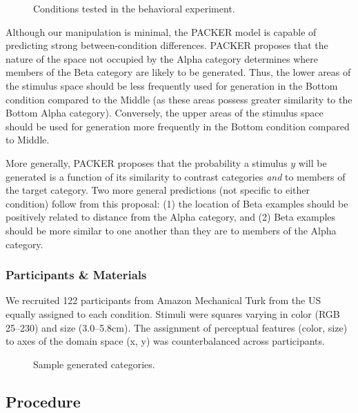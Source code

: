 \documentclass[10pt,letterpaper]{article}
\newcommand\inputpgf[2]{{
\let\pgfimageWithoutPath\pgfimage
\renewcommand{\pgfimage}[2][]{\pgfimageWithoutPath[##1]{#1/##2}}

}}
\begin{document}
\begin{figure}
    \begin{center}
    
    \caption{Conditions tested in the behavioral experiment.}
    \label{fig:middle-bottom-conditions}
    \end{center}
\end{figure}

Although our manipulation is minimal, the PACKER model is capable of predicting strong between-condition differences. PACKER proposes that the nature of the space not occupied by the Alpha category determines where members of the Beta category are likely to be generated. Thus, the lower areas of the stimulus space should be less frequently used for generation in the Bottom condition compared to the Middle (as these areas possess greater similarity to the Bottom Alpha category). Conversely, the upper areas of the stimulus space should be used for generation more frequently in the Bottom condition compared to Middle.

More generally, PACKER proposes that the probability a stimulus $y$ will be generated is a function of its similarity to contrast categories \textit{and} to members of the target category. Two more general predictions (not specific to either condition) follow from this proposal: (1) the location of Beta examples should be positively related to distance from the Alpha category, and (2) Beta examples should be more similar to one another than they are to members of the Alpha category.

\subsubsection{Participants \& Materials}
We recruited 122 participants from Amazon Mechanical Turk from the US equally assigned to each condition. Stimuli were squares varying in color (RGB 25--230) and size (3.0--5.8cm). The assignment of perceptual features (color, size) to axes of the domain space (x, y) was counterbalanced across participants.

\begin{figure}[ht!]
    \begin{center}
    \inputpgf{figs/}{beta.samples.pgf}
    \caption{Sample generated categories. }
    \label{fig:beta.samples}
    \end{center}
\end{figure}

\subsection{Procedure}
\end{document}
